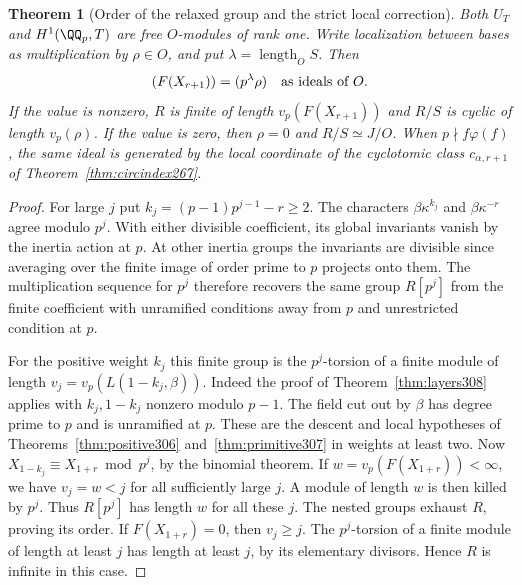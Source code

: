 \documentclass[a4paper,11pt]{article}
\newtheorem{theorem}[proposition]{Theorem}
\theoremstyle{definition}
\theoremstyle{remark}
\numberwithin{equation}{section}
\begin{document}
\begin{theorem}[Order of the relaxed group and the strict local correction]\leavevmode
\label{thm:localvalue309}
Both \(U_T\) and \(H^1(\QQ_p,T)\) are free \(O\)-modules of rank
one. Write localization between bases as multiplication by
\(\rho\in O\), and put \(\lambda=\operatorname{length}_O S\).
Then
\[
  (F(X_{r+1}))=(p^\lambda\rho)\quad\hbox{as ideals of }O.
\]
If the value is nonzero, \(R\) is finite of length
\(v_p(F(X_{r+1}))\) and \(R/S\) is cyclic of length
\(v_p(\rho)\). If the value is zero, then \(\rho=0\) and
\(R/S\simeq J/O\). When \(p\nmid f\varphi(f)\), the same ideal is
generated by the local coordinate of the cyclotomic class
\(c_{\alpha,r+1}\) of Theorem~\ref{thm:circindex267}.
\end{theorem}
\begin{proof}
For large \(j\) put \(k_j=(p-1)p^{j-1}-r\ge2\).
The characters \(\beta\kappa^{k_j}\) and \(\beta\kappa^{-r}\)
agree modulo \(p^j\). With either divisible coefficient, its global
invariants vanish by the inertia action at \(p\). At other inertia
groups the invariants are divisible since averaging over the finite
image of order prime to \(p\) projects onto them. The multiplication
sequence for \(p^j\) therefore recovers the same group \(R[p^j]\)
from the finite coefficient with unramified conditions away from
\(p\) and unrestricted condition at \(p\).

For the positive weight \(k_j\) this finite group is the \(p^j\)-torsion
of a finite module of length \(v_j=v_p(L(1-k_j,\beta))\).
Indeed the proof of Theorem~\ref{thm:layers308} applies with
\(k_j,1-k_j\) nonzero modulo \(p-1\). The field cut out by \(\beta\)
has degree prime to \(p\) and is unramified at \(p\). These are
the descent and local hypotheses of Theorems~\ref{thm:positive306}
and~\ref{thm:primitive307} in weights at least two. Now
\(X_{1-k_j}\equiv X_{1+r}\bmod p^j\), by the binomial theorem.
If \(w=v_p(F(X_{1+r}))<\infty\), we have \(v_j=w<j\) for all
sufficiently large \(j\). A module of length \(w\) is then killed
by \(p^j\). Thus \(R[p^j]\) has length \(w\) for all these \(j\).
The nested groups exhaust \(R\), proving its order. If \(F(X_{1+r})=0\),
then \(v_j\ge j\). The \(p^j\)-torsion of a finite module of length
at least \(j\) has length at least \(j\), by its elementary divisors.
Hence \(R\) is infinite in this case.


\end{proof}
\end{document}
